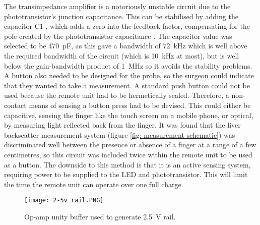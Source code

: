 
The transimpedance amplifier is a notoriously unstable circuit due to the phototransistor's junction capacitance. This can be stabilised by adding the capacitor C1 \cite{tia_stability}, which adds a zero into the feedback factor, compensating for the pole created by the phototransistor capacitance \cite{tia_stability}. The capacitor value was selected to be \SI{470}{\pico\farad}, as this gave a bandwidth of \SI{72}{\kilo\hertz} which is well above the required bandwidth of the circuit (which is \SI{10}{\kilo\hertz} at most), but is well below the gain-bandwidth product of \SI{1}{\mega\hertz} so it avoids the stability problems.\\

A button also needed to be designed for the probe, so the surgeon could indicate that they wanted to take a measurement. A standard push button could not be used because the remote unit had to be hermetically sealed. Therefore, a non-contact means of sensing a button press had to be devised. This could either be capacitive, sensing the finger like the touch screen on a mobile phone, or optical, by measuring light reflected back from the finger. It was found that the liver backscatter measurement system (figure \ref{fig: measurement schematic}) was discriminated well between the presence or absence of a finger at a range of a few centimetres, so this circuit was included twice within the remote unit to be used as a button. The downside to this method is that it is an active sensing system, requiring power to be supplied to the LED and phototransistor. This will limit the time the remote unit can operate over one full charge. \\

\begin{figure}[htbp]
	\centering
	\texttt{[image: 2-5v rail.PNG]}
	\caption{Op-amp unity buffer used to generate \SI{2.5}{\volt} rail.}
	\label{fig: 2.5v rail}
\end{figure}

